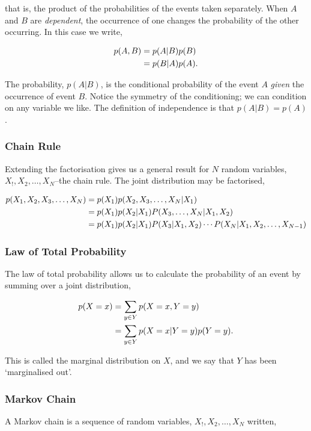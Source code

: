 \documentclass[11pt]{amsart}
\begin{document}
that is, the product of the probabilities of the events taken separately. When $A$ and $B$ are \emph{dependent}, the occurrence of one changes the probability of the other occurring. In this case we write,

\begin{align}
p(A, B) &= p(A|B)p(B) \notag \\
&= p(B|A)p(A). \notag
\end{align}

The probability, $p(A|B)$, is the conditional probability of the event $A$ \emph{given} the occurrence of event $B$. Notice the symmetry of the conditioning; we can condition on any variable we like. The definition of independence is that $p(A|B) = p(A)$.

\subsubsection{Chain Rule}

Extending the factorisation gives us a general result for $N$ random variables, $X_!, X_2, \dots, X_N$--the chain rule. The joint distribution may be factorised,

\begin{align}
p(X_1, X_2, X_3,\dots,X_N) &= p(X_1)p(X_2, X_3, \dots, X_N|X_1) \notag \\
&= p(X_1)p(X_2|X_1)P(X_3, \dots, X_N|X_1, X_2) \notag \\
&= p(X_1)p(X_2|X_1)P(X_3|X_1, X_2)\cdots P(X_N|X_1, X_2, \dots, X_{N-1}) \notag
\end{align}

\subsubsection{Law of Total Probability}

The law of total probability allows us to calculate the probability of an event by summing over a joint distribution,

\begin{align}
p(X=x) &= \sum_{y \in Y} p(X=x, Y=y) \notag \\
&= \sum_{y \in Y} p(X=x|Y=y)p(Y=y). \notag
\end{align}

This is called the marginal distribution on $X$, and we say that $Y$ has been `marginalised out'.

\subsubsection{Markov Chain}
A Markov chain is a sequence of random variables, $X_!, X_2, \dots, X_N$ written,
\end{document}

